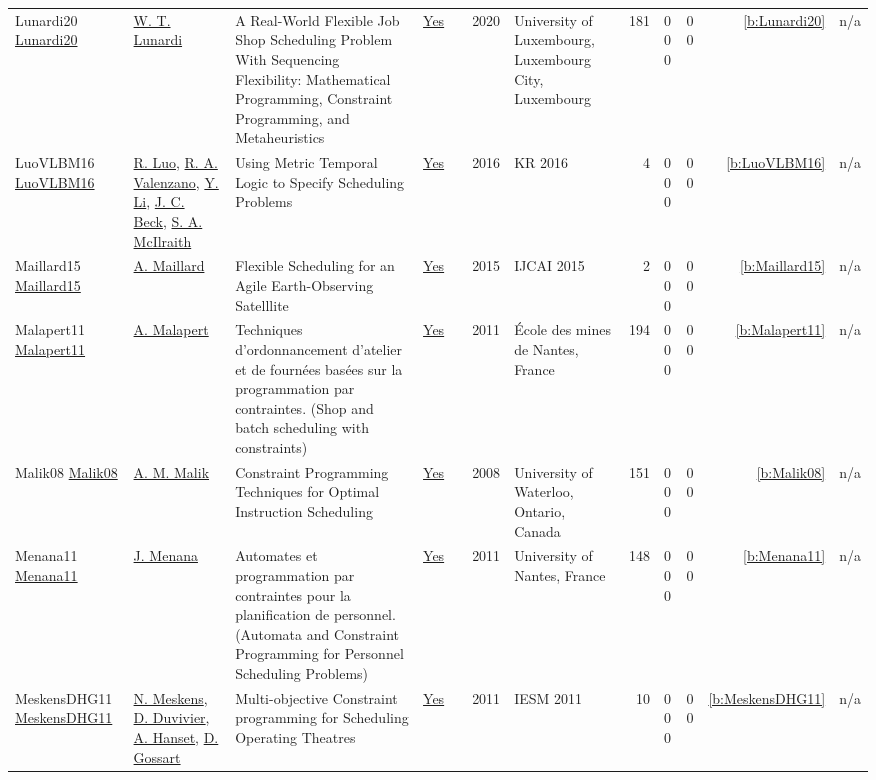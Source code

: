 {\begin{longtable}{>{\raggedright\arraybackslash}p{3cm}>{\raggedright\arraybackslash}p{4.5cm}>{\raggedright\arraybackslash}p{6.0cm}rrrp{2.5cm}rp{1cm}p{1cm}rr}
Lunardi20 \href{http://orbilu.uni.lu/handle/10993/43893}{Lunardi20} & \hyperref[auth:a496]{W. T. Lunardi} & A Real-World Flexible Job Shop Scheduling Problem With Sequencing Flexibility: Mathematical Programming, Constraint Programming, and Metaheuristics & \href{../works/Lunardi20.pdf}{Yes} & \cite{Lunardi20} & 2020 & University of Luxembourg, Luxembourg City, Luxembourg & 181 & 0 0 0 & 0 0 & \ref{b:Lunardi20} & n/a\\
LuoVLBM16 \href{http://www.aaai.org/ocs/index.php/KR/KR16/paper/view/12909}{LuoVLBM16} & \hyperref[auth:a813]{R. Luo}, \hyperref[auth:a814]{R. A. Valenzano}, \hyperref[auth:a815]{Y. Li}, \hyperref[auth:a89]{J. C. Beck}, \hyperref[auth:a816]{S. A. McIlraith} & Using Metric Temporal Logic to Specify Scheduling Problems & \href{../works/LuoVLBM16.pdf}{Yes} & \cite{LuoVLBM16} & 2016 & KR 2016 & 4 & 0 0 0 & 0 0 & \ref{b:LuoVLBM16} & n/a\\
Maillard15 \href{http://ijcai.org/Abstract/15/637}{Maillard15} & \hyperref[auth:a787]{A. Maillard} & Flexible Scheduling for an Agile Earth-Observing Satelllite & \href{../works/Maillard15.pdf}{Yes} & \cite{Maillard15} & 2015 & IJCAI 2015 & 2 & 0 0 0 & 0 0 & \ref{b:Maillard15} & n/a\\
Malapert11 \href{https://tel.archives-ouvertes.fr/tel-00630122}{Malapert11} & \hyperref[auth:a82]{A. Malapert} & Techniques d'ordonnancement d'atelier et de fourn{\'{e}}es bas{\'{e}}es sur la programmation par contraintes. (Shop and batch scheduling with constraints) & \href{../works/Malapert11.pdf}{Yes} & \cite{Malapert11} & 2011 & {\'{E}}cole des mines de Nantes, France & 194 & 0 0 0 & 0 0 & \ref{b:Malapert11} & n/a\\
Malik08 \href{https://hdl.handle.net/10012/3612}{Malik08} & \hyperref[auth:a638]{A. M. Malik} & Constraint Programming Techniques for Optimal Instruction Scheduling & \href{../works/Malik08.pdf}{Yes} & \cite{Malik08} & 2008 & University of Waterloo, Ontario, Canada & 151 & 0 0 0 & 0 0 & \ref{b:Malik08} & n/a\\
Menana11 \href{https://tel.archives-ouvertes.fr/tel-00785838}{Menana11} & \hyperref[auth:a614]{J. Menana} & Automates et programmation par contraintes pour la planification de personnel. (Automata and Constraint Programming for Personnel Scheduling Problems) & \href{../works/Menana11.pdf}{Yes} & \cite{Menana11} & 2011 & University of Nantes, France & 148 & 0 0 0 & 0 0 & \ref{b:Menana11} & n/a\\
MeskensDHG11 \href{}{MeskensDHG11} & \hyperref[auth:a597]{N. Meskens}, \hyperref[auth:a598]{D. Duvivier}, \hyperref[auth:a1374]{A. Hanset}, \hyperref[auth:a1375]{D. Gossart} & Multi-objective Constraint programming for Scheduling Operating Theatres & \href{../works/MeskensDHG11.pdf}{Yes} & \cite{MeskensDHG11} & 2011 & IESM 2011 & 10 & 0 0 0 & 0 0 & \ref{b:MeskensDHG11} & n/a\\

\end{longtable}}
